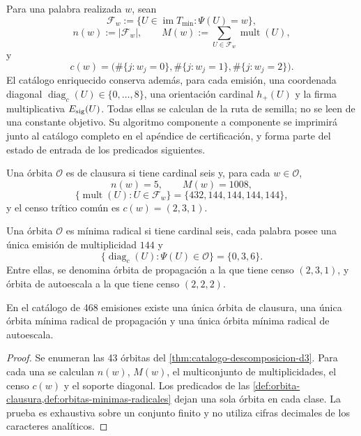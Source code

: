 Para una palabra realizada \(w\), sean
\[
 \mathcal F_w:=\{U\in\operatorname{im}T_{\min}:\Psi(U)=w\},
\]
\[
 n(w):=|\mathcal F_w|,
 \qquad
 M(w):=\sum_{U\in\mathcal F_w}\operatorname{mult}(U),
\]
y
\[
 c(w)=\bigl(\#\{j:w_j=0\},\#\{j:w_j=1\},\#\{j:w_j=2\}\bigr).
\]
El catálogo enriquecido conserva además, para cada emisión, una coordenada
diagonal \(\operatorname{diag}_c(U)\in\{0,\ldots,8\}\), una orientación
cardinal \(h_+(U)\) y la firma multiplicativa \(E_{\rm sig}(U)\). Todas
ellas se calculan de la ruta de semilla; no se leen de una constante
objetivo. Su algoritmo componente a componente se imprimirá junto al catálogo
completo en el apéndice de certificación, y forma parte del estado de entrada
de los predicados siguientes.

\begin{definition}
\label{def:orbita-clausura}
Una órbita \(\mathcal O\) es de clausura si tiene cardinal seis y, para
cada \(w\in\mathcal O\),
\[
 n(w)=5,
 \qquad
 M(w)=1008,
\]
\[
 \{\operatorname{mult}(U):U\in\mathcal F_w\}
 =\{432,144,144,144,144\},
\]
y el censo trítico común es \(c(w)=(2,3,1)\).
\end{definition}

\begin{definition}
\label{def:orbitas-minimas-radicales}
Una órbita \(\mathcal O\) es mínima radical si tiene cardinal seis, cada
palabra posee una única emisión de multiplicidad \(144\) y
\[
 \{\operatorname{diag}_c(U):\Psi(U)\in\mathcal O\}=\{0,3,6\}.
\]
Entre ellas, se denomina órbita de propagación a la que tiene censo
\((2,3,1)\), y órbita de autoescala a la que tiene censo \((2,2,2)\).
\end{definition}

\begin{theorem}
\label{thm:unicidad-tres-orbitas-estructurales}
En el catálogo de 468 emisiones existe una única órbita de clausura, una
única órbita mínima radical de propagación y una única órbita mínima radical
de autoescala.
\end{theorem}

\begin{proof}
Se enumeran las 43 órbitas del \cref{thm:catalogo-descomposicion-d3}. Para
cada una se calculan \(n(w)\), \(M(w)\), el multiconjunto de
multiplicidades, el censo \(c(w)\) y el soporte diagonal. Los predicados de
las \cref{def:orbita-clausura,def:orbitas-minimas-radicales} dejan una sola
órbita en cada clase. La prueba es exhaustiva sobre un conjunto finito y no
utiliza cifras decimales de los caracteres analíticos.
\end{proof}

